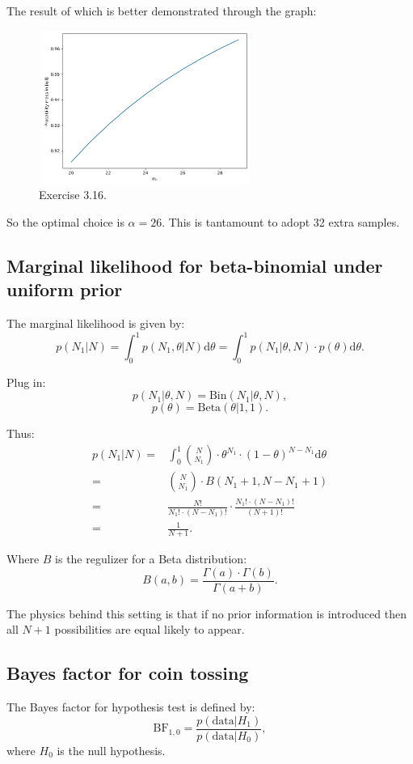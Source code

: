 \documentclass[UTF8]{ctexart}
\begin{document}
The result of which is better demonstrated through the graph:
\begin{figure}[htbp]
\centering
\includegraphics[width=7cm,height=5cm]{./figures/3-16.png}
\caption{Exercise 3.16.}
\end{figure}
So the optimal choice is $\alpha=26$.
This is tantamount to adopt 32 extra samples.

\subsection{Marginal likelihood for beta-binomial under uniform prior}
The marginal likelihood is given by:
$$p(N_{1}|N)=\int_{0}^{1} p(N_{1},\theta|N) \text{d}\theta = \int_{0}^{1} p(N_{1}|\theta,N)\cdot p(\theta)\text{d}\theta.$$

Plug in:
$$p(N_{1}|\theta,N)=\text{Bin}(N_{1}|\theta,N),$$
$$p(\theta) = \text{Beta}(\theta|1,1).$$

Thus:
\begin{align}
p(N_{1}|N)=&\int_{0}^{1} \binom{N}{N_{1}}\cdot \theta^{N_{1}}\cdot (1-\theta)^{N-N_{1}} \text{d}\theta \nonumber \\
=&\binom{N}{N_{1}}\cdot B(N_{1} +1,N-N_{1}+1)\nonumber \\
=&\frac{N!}{N_{1}!\cdot (N-N_{1})!}\cdot\frac{N_{1}! \cdot(N-N_{1})!}{(N+1)!}\nonumber \\
=&\frac{1}{N+1}. \nonumber
\end{align}

Where $B$ is the regulizer for a Beta distribution:
$$B(a,b)=\frac{\Gamma(a)\cdot\Gamma(b)}{\Gamma(a+b)}.$$

The physics behind this setting is that if no prior information is introduced then all $N+1$ possibilities are equal likely to appear.

\subsection{Bayes factor for coin tossing}
The Bayes factor for hypothesis test is defined by:
$$\text{BF}_{1,0}=\frac{p(\text{data}|H_{1})}{p(\text{data}|H_{0})},$$
where $H_{0}$ is the null hypothesis.
\end{document}
